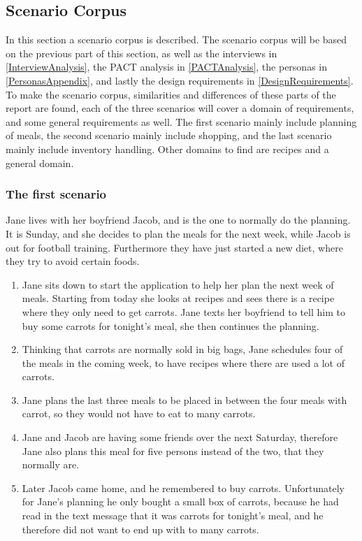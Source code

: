\subsection{Scenario Corpus} \label{ScenarioCorpus}

In this section a scenario corpus is described. The scenario corpus will be based on the previous part of this section, as well as the interviews in \cref{InterviewAnalysis}, the PACT analysis in \cref{PACTAnalysis}, the personas in \cref{PersonasAppendix}, and lastly the design requirements in \cref{DesignRequirements}. To make the scenario corpus, similarities and differences of these parts of the report are found, each of the three scenarios will cover a domain of requirements, and some general requirements as well. The first scenario mainly include planning of meals, the second scenario mainly include shopping, and the last scenario mainly include inventory handling. Other domains to find are recipes and a general domain.

\subsubsection{The first scenario}
Jane lives with her boyfriend Jacob, and is the one to normally do the planning. It is Sunday, and she decides to plan the meals for the next week, while Jacob is out for football training. Furthermore they have just started a new diet, where they try to avoid certain foods.
\begin{enumerate}
  \item Jane sits down to start the application to help her plan the next week of meals. Starting from today she looks at recipes and sees there is a recipe where they only need to get carrots. Jane texts her boyfriend to tell him to buy some carrots for tonight's meal, she then continues the planning.
  \item Thinking that carrots are normally sold in big bags, Jane schedules four of the meals in the coming week, to have recipes where there are used a lot of carrots.
  \item Jane plans the last three meals to be placed in between the four meals with carrot, so they would not have to eat to many carrots.
  \item Jane and Jacob are having some friends over the next Saturday, therefore Jane also plans this meal for five persons instead of the two, that they normally are.
  \item Later Jacob came home, and he remembered to buy carrots. Unfortunately for Jane's planning he only bought a small box of carrots, because he had read in the text message that it was carrots for tonight's meal, and he therefore did not want to end up with to many carrots.
\end{enumerate}

